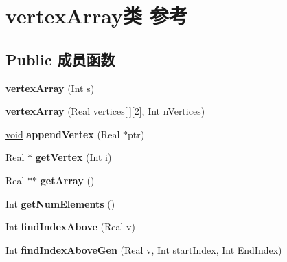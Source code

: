 \hypertarget{classvertex_array}{}\section{vertex\+Array类 参考}
\label{classvertex_array}
\subsection*{Public 成员函数}
\begin{DoxyCompactItemize}
\item 
\mbox{\label{classvertex_array_aea3fc40f0d0abce9c95385816d9fb6c9}} 
{\bfseries vertex\+Array} (Int s)
\item 
\mbox{\label{classvertex_array_aa4e504e7129e34c08142300ed47bb3dd}} 
{\bfseries vertex\+Array} (Real vertices\mbox{[}$\,$\mbox{]}\mbox{[}2\mbox{]}, Int n\+Vertices)
\item 
\mbox{\label{classvertex_array_a9928bcaa9ab2c0ae03d646526cf7bb8c}} 
\hyperlink{interfacevoid}{void} {\bfseries append\+Vertex} (Real $\ast$ptr)
\item 
\mbox{\label{classvertex_array_a993f1fb68c25691a50644f65e58ba90f}} 
Real $\ast$ {\bfseries get\+Vertex} (Int i)
\item 
\mbox{\label{classvertex_array_a6fe7575f061c42c4fdcd40b4f51a3a49}} 
Real $\ast$$\ast$ {\bfseries get\+Array} ()
\item 
\mbox{\label{classvertex_array_ab0a27f3f02ae9e864f0ac5120ecf2c83}} 
Int {\bfseries get\+Num\+Elements} ()
\item 
\mbox{\label{classvertex_array_a41e3b2391e223a15cc165b56bb095e6c}} 
Int {\bfseries find\+Index\+Above} (Real v)
\item 
\mbox{\label{classvertex_array_af819734568f99155d6240d16b4be8902}} 
Int {\bfseries find\+Index\+Above\+Gen} (Real v, Int start\+Index, Int End\+Index)
\item 
\mbox{\label{classvertex_array_ad1a03b92de348d02779d898832d37ee3}} 
$$
\end{DoxyCompactItemize}
